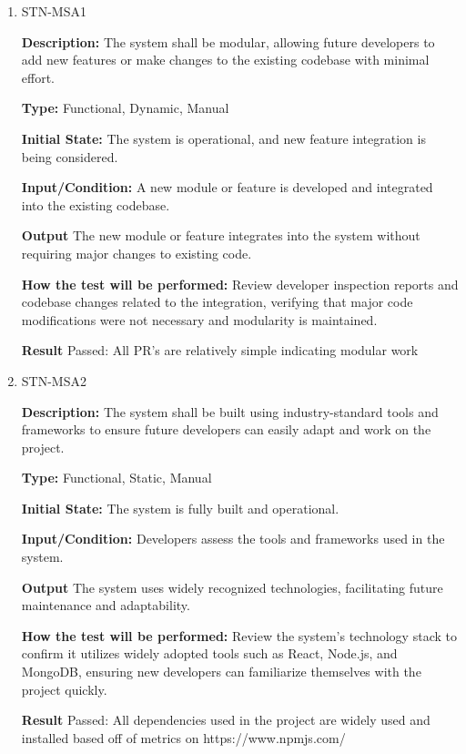 \documentclass[12pt, titlepage]{article}
\begin{document}
\begin{enumerate}

\item{STN-MSA1\\}

\textbf{Description:} The system shall be modular, allowing future developers to add new features or make changes to the existing codebase with minimal effort.

\textbf{Type:} Functional, Dynamic, Manual

\textbf{Initial State:} The system is operational, and new feature integration is being considered.

\textbf{Input/Condition:} A new module or feature is developed and integrated into the existing codebase.

\textbf{Output} The new module or feature integrates into the system without requiring major changes to existing code.

\textbf{How the test will be performed:} Review developer inspection reports and codebase changes related to the integration, verifying that major code modifications were not necessary and modularity is maintained.

\textbf{Result} Passed: All PR's are relatively simple indicating modular work

\item{STN-MSA2\\}

\textbf{Description:} The system shall be built using industry-standard tools and frameworks to ensure future developers can easily adapt and work on the project.

\textbf{Type:} Functional, Static, Manual

\textbf{Initial State:} The system is fully built and operational.

\textbf{Input/Condition:} Developers assess the tools and frameworks used in the system.

\textbf{Output} The system uses widely recognized technologies, facilitating future maintenance and adaptability.

\textbf{How the test will be performed:} Review the system's technology stack to confirm it utilizes widely adopted tools such as React, Node.js, and MongoDB, ensuring new developers can familiarize themselves with the project quickly.

\textbf{Result} Passed: All dependencies used in the project are widely used and installed based off of metrics on https://www.npmjs.com/

\end{enumerate}
\end{document}
